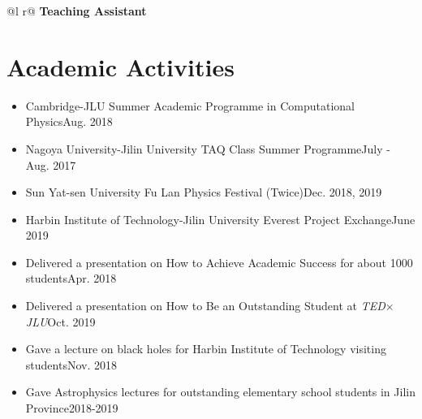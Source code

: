 \documentclass[a4paper,12pt]{article}
\begin{document}
\begin{tabularx}{\linewidth}{ @{}l r@{} }
\textbf{Teaching Assistant} \\[3.75pt]
\end{tabularx}



\section{Academic Activities}

\begin{itemize}[leftmargin=0cm]
\setlength{\itemsep}{-5pt}
\item[] Cambridge-JLU Summer Academic Programme in Computational Physics\hfill Aug. 2018
\item[] Nagoya University-Jilin University TAQ Class Summer Programme\hfill July - Aug. 2017
\item[] Sun Yat-sen University Fu Lan Physics Festival (Twice)\hfill Dec. 2018, 2019
\item[] Harbin Institute of Technology-Jilin University Everest Project Exchange\hfill June 2019
\item[] Delivered a presentation on How to Achieve Academic Success for about {1000} students\hfill Apr. 2018
\item[] Delivered a presentation on How to Be an Outstanding Student at {\textit{TED$\times$JLU}}\hfill Oct. 2019
\item[] Gave a lecture on black holes for Harbin Institute of Technology visiting students\hfill Nov. 2018
\item[] Gave Astrophysics lectures for outstanding elementary school students in Jilin Province\hfill 2018-2019
\end{itemize}
\end{document}

